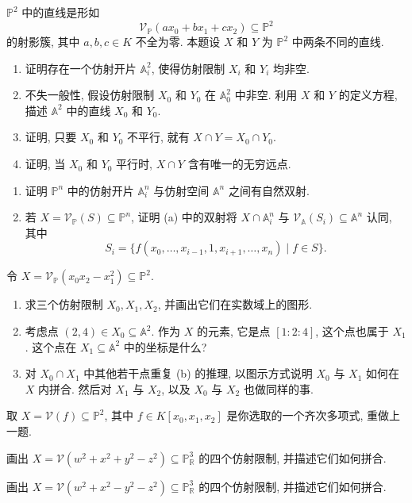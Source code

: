 \BookExerciseHeading
\begin{BookExercises}
  \item\label{ex:intersection-of-two-projective-lines} $\mathbb{P}^{2}$ 中的直线是形如
  \[
    \mathcal{V}_{\mathbb{P}}(ax_{0}+bx_{1}+cx_{2})\subseteq\mathbb{P}^{2}
  \]
  的射影簇, 其中 $a,b,c\in K$ 不全为零. 本题设 $X$ 和 $Y$ 为 $\mathbb{P}^{2}$ 中两条不同的直线.
  \begin{enumerate}
    \item 证明存在一个仿射开片 $\mathbb{A}_{i}^{2}$, 使得仿射限制 $X_{i}$ 和 $Y_{i}$ 均非空.
    \item 不失一般性, 假设仿射限制 $X_{0}$ 和 $Y_{0}$ 在 $\mathbb{A}_{0}^{2}$ 中非空. 利用 $X$ 和 $Y$ 的定义方程, 描述 $\mathbb{A}^{2}$ 中的直线 $X_{0}$ 和 $Y_{0}$.
    \item 证明, 只要 $X_{0}$ 和 $Y_{0}$ 不平行, 就有 $X\cap Y=X_{0}\cap Y_{0}$.
    \item 证明, 当 $X_{0}$ 和 $Y_{0}$ 平行时, $X\cap Y$ 含有唯一的无穷远点.
  \end{enumerate}
  \item\label{ex:affine-patch-bijection-and-restriction}
  \begin{enumerate}
    \item 证明 $\mathbb{P}^{n}$ 中的仿射开片 $\mathbb{A}_{i}^{n}$ 与仿射空间 $\mathbb{A}^{n}$ 之间有自然双射.
    \item 若 $X=\mathcal{V}_{\mathbb{P}}(S)\subseteq\mathbb{P}^{n}$, 证明 (a) 中的双射将 $X\cap\mathbb{A}_{i}^{n}$ 与 $\mathcal{V}_{\mathbb{A}}(S_{i})\subseteq\mathbb{A}^{n}$ 认同, 其中
    \[
      S_{i}=\{f(x_{0},\ldots,x_{i-1},1,x_{i+1},\ldots,x_{n})\mid f\in S\}.
    \]
  \end{enumerate}
  \item\label{ex:three-affine-restrictions-of-a-parabola} 令 $X=\mathcal{V}_{\mathbb{P}}(x_{0}x_{2}-x_{1}^{2})\subseteq\mathbb{P}^{2}$.
  \begin{enumerate}
    \item 求三个仿射限制 $X_{0},X_{1},X_{2}$, 并画出它们在实数域上的图形.
    \item 考虑点 $(2,4)\in X_{0}\subseteq\mathbb{A}^{2}$. 作为 $X$ 的元素, 它是点 $[1:2:4]$, 这个点也属于 $X_{1}$. 这个点在 $X_{1}\subseteq\mathbb{A}^{2}$ 中的坐标是什么?
    \item 对 $X_{0}\cap X_{1}$ 中其他若干点重复 (b) 的推理, 以图示方式说明 $X_{0}$ 与 $X_{1}$ 如何在 $X$ 内拼合. 然后对 $X_{1}$ 与 $X_{2}$, 以及 $X_{0}$ 与 $X_{2}$ 也做同样的事.
  \end{enumerate}
  \item\label{ex:three-affine-restrictions-of-a-chosen-curve} 取 $X=\mathcal{V}(f)\subseteq\mathbb{P}^{2}$, 其中 $f\in K[x_{0},x_{1},x_{2}]$ 是你选取的一个齐次多项式, 重做上一题.
  \item\label{ex:affine-restrictions-of-real-projective-quadric} 画出 $X=\mathcal{V}(w^{2}+x^{2}+y^{2}-z^{2})\subseteq\mathbb{P}_{\mathbb{R}}^{3}$ 的四个仿射限制, 并描述它们如何拼合.
  \item\label{ex:affine-restrictions-of-real-split-projective-quadric} 画出 $X=\mathcal{V}(w^{2}+x^{2}-y^{2}-z^{2})\subseteq\mathbb{P}_{\mathbb{R}}^{3}$ 的四个仿射限制, 并描述它们如何拼合.
\end{BookExercises}
